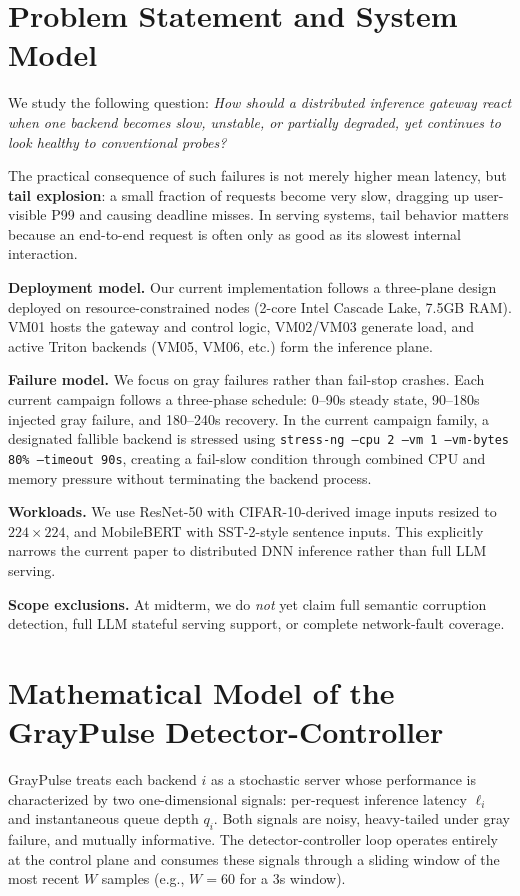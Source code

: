 \documentclass[12pt,conference]{IEEEtran}
\begin{document}
\section{Problem Statement and System Model}

We study the following question: \emph{How should a distributed inference gateway react when one backend becomes slow, unstable, or partially degraded, yet continues to look healthy to conventional probes?}

The practical consequence of such failures is not merely higher mean latency, but \textbf{tail explosion}: a small fraction of requests become very slow, dragging up user-visible P99 and causing deadline misses. In serving systems, tail behavior matters because an end-to-end request is often only as good as its slowest internal interaction.

\noindent\textbf{Deployment model.}
Our current implementation follows a three-plane design deployed on resource-constrained nodes (2-core Intel Cascade Lake, 7.5GB RAM). VM01 hosts the gateway and control logic, VM02/VM03 generate load, and active Triton backends (VM05, VM06, etc.) form the inference plane.

\noindent\textbf{Failure model.}
We focus on gray failures rather than fail-stop crashes. Each current campaign follows a three-phase schedule: 0--90s steady state, 90--180s injected gray failure, and 180--240s recovery. In the current campaign family, a designated fallible backend is stressed using \texttt{stress-ng --cpu 2 --vm 1 --vm-bytes 80\% --timeout 90s}, creating a fail-slow condition through combined CPU and memory pressure without terminating the backend process.

\noindent\textbf{Workloads.}
We use ResNet-50 with CIFAR-10-derived image inputs resized to $224\times224$, and MobileBERT with SST-2-style sentence inputs. This explicitly narrows the current paper to distributed DNN inference rather than full LLM serving.

\noindent\textbf{Scope exclusions.}
At midterm, we do \emph{not} yet claim full semantic corruption detection, full LLM stateful serving support, or complete network-fault coverage.

\section{Mathematical Model of the GrayPulse Detector-Controller}

GrayPulse treats each backend $i$ as a stochastic server whose performance is characterized by two one-dimensional signals: per-request inference latency $\ell_i$ and instantaneous queue depth $q_i$. Both signals are noisy, heavy-tailed under gray failure, and mutually informative. The detector-controller loop operates entirely at the control plane and consumes these signals through a sliding window of the most recent $W$ samples (e.g., $W=60$ for a 3s window).
\end{document}
